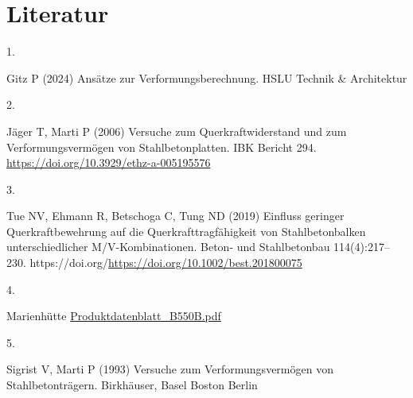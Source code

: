\documentclass[
  11pt,
  letterpaper,
]{scrreprt}
\newlength{\cslhangindent}
\newlength{\csllabelwidth}
\newenvironment{CSLReferences}[2] %
 {\begin{list}{}{%
  \setlength{\itemindent}{0pt}
  \setlength{\leftmargin}{0pt}
  \setlength{\parsep}{0pt}
  \ifodd #1
   \setlength{\leftmargin}{\cslhangindent}
   \setlength{\itemindent}{-1\cslhangindent}
  \fi
  \setlength{\itemsep}{#2\baselineskip}}}
 {\end{list}}
\newcommand{\CSLLeftMargin}[1]{\parbox[t]{\csllabelwidth}{\strut#1\strut}}
\newcommand{\CSLRightInline}[1]{\parbox[t]{\linewidth - \csllabelwidth}{\strut#1\strut}}
\begin{document}
\chapter*{Literatur}\label{literatur}


\label{refs}
\begin{CSLReferences}{0}{1}
\CSLLeftMargin{1. }%
\CSLRightInline{Gitz P (2024) Ansätze zur {Verformungsberechnung}. HSLU
Technik \& Architektur}

\CSLLeftMargin{2. }%
\CSLRightInline{Jäger T, Marti P (2006) Versuche zum
{Querkraftwiderstand} und zum {Verformungsvermögen} von
{Stahlbetonplatten}. IBK Bericht 294.
\url{https://doi.org/10.3929/ethz-a-005195576}}

\CSLLeftMargin{3. }%
\CSLRightInline{Tue NV, Ehmann R, Betschoga C, Tung ND (2019) Einfluss
geringer {Querkraftbewehrung} auf die {Querkrafttragfähigkeit} von
{Stahlbetonbalken} unterschiedlicher {M}/{V}-{Kombinationen}. Beton- und
Stahlbetonbau 114(4):217--230.
https://doi.org/\url{https://doi.org/10.1002/best.201800075}}

\CSLLeftMargin{4. }%
\CSLRightInline{Marienhütte
\href{https://www.marienhuette.at/wp-content/uploads/Produktdatenblatt-B550B.pdf}{Produktdatenblatt\_B550B.pdf}}

\CSLLeftMargin{5. }%
\CSLRightInline{Sigrist V, Marti P (1993) Versuche zum
{Verformungsvermögen} von {Stahlbetonträgern}. Birkhäuser, Basel Boston
Berlin}

\end{CSLReferences}
\end{document}
